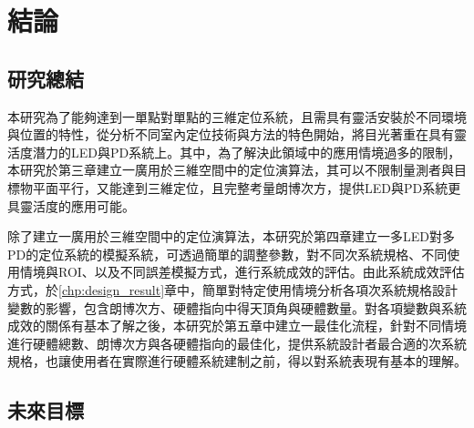 \chapter{結論}
\label{chp:6}


\section{研究總結}

本研究為了能夠達到一單點對單點的三維定位系統，且需具有靈活安裝於不同環境與位置的特性，從分析不同室內定位技術與方法的特色開始，將目光著重在具有靈活度潛力的LED與PD系統上。其中，為了解決此領域中的應用情境過多的限制，本研究於第三章建立一廣用於三維空間中的定位演算法，其可以不限制量測者與目標物平面平行，又能達到三維定位，且完整考量朗博次方，提供LED與PD系統更具靈活度的應用可能。

除了建立一廣用於三維空間中的定位演算法，本研究於第四章建立一多LED對多PD的定位系統的模擬系統，可透過簡單的調整參數，對不同次系統規格、不同使用情境與ROI、以及不同誤差模擬方式，進行系統成效的評估。由此系統成效評估方式，於\ref{chp:design_result}章中，簡單對特定使用情境分析各項次系統規格設計變數的影響，包含朗博次方、硬體指向中得天頂角與硬體數量。對各項變數與系統成效的關係有基本了解之後，本研究於第五章中建立一最佳化流程，針對不同情境進行硬體總數、朗博次方與各硬體指向的最佳化，提供系統設計者最合適的次系統規格，也讓使用者在實際進行硬體系統建制之前，得以對系統表現有基本的理解。



\section{未來目標}


